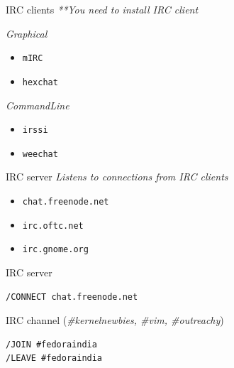 \documentclass[10pt]{beamer}
\begin{document}
\begin{frame}[fragile,label={sec:orgb01ffde}]{IRC clients}
 \emph{**You need to install IRC client}

\begin{block}{\emph{Graphical}}
\begin{itemize}
\item \texttt{mIRC}
\item \texttt{hexchat}
\end{itemize}
\end{block}

\begin{block}{\emph{CommandLine}}
\begin{itemize}
\item \texttt{irssi}
\item \texttt{weechat}
\end{itemize}
\end{block}
\end{frame}

\begin{frame}[fragile,label={sec:orge8a01dd}]{IRC server}
 \emph{Listens to connections from IRC clients}


\begin{itemize}
\item \texttt{chat.freenode.net}
\item \texttt{irc.oftc.net}
\item \texttt{irc.gnome.org}
\end{itemize}
\end{frame}

\begin{frame}[fragile,label={sec:org2face9b}]{IRC server}
 \begin{verbatim}
/CONNECT chat.freenode.net
\end{verbatim}
\end{frame}


\begin{frame}[fragile,label={sec:org7a11e21}]{IRC channel}
 (\emph{\#kernelnewbies, \#vim, \#outreachy})


\begin{verbatim}
/JOIN #fedoraindia
/LEAVE #fedoraindia
\end{verbatim}
\end{frame}
\end{document}
